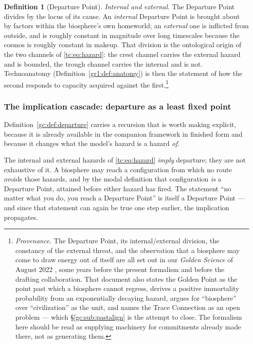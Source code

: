\documentclass[11pt]{article}
\numberwithin{equation}{section}
\theoremstyle{plain}
\theoremstyle{definition}
\newtheorem{definition}[theorem]{Definition}
\theoremstyle{remark}
\begin{document}
\begin{definition}[Departure Point]
\emph{Internal and external.} The Departure Point divides by the
locus of its cause. An \emph{internal} Departure Point is brought about
by factors within the biosphere's own homeworld; an \emph{external} one
is inflicted from outside, and is roughly constant in magnitude over
long timescales because the cosmos is roughly constant in makeup. That
division is the ontological origin of the two channels of
\eqref{tc:eq:hazard}: the crest channel carries the external hazard and
is bounded, the trough channel carries the internal and is not.
Technoanatomy (Definition~\ref{gr1:def:anatomy}) is then the statement
of how the second responds to capacity acquired against the
first.\footnote{\emph{Provenance.} The Departure Point, its
internal/external division, the constancy of the external threat, and
the observation that a biosphere may come to draw energy out of itself
are all set out in our \emph{Golden Science} of August 2022
\cite{GoldenScience22}, some years before the present formalism and
before the drafting collaboration. That document also states the Golden Point as the point
past which a biosphere cannot regress, derives a positive immortality
probability from an exponentially decaying hazard, argues for
``biosphere'' over ``civilization'' as the unit, and names the Trace
Connection as an open problem --- which \S\ref{gc:sub:pastalign} is the
attempt to close. The formalism here should be read as supplying
machinery for commitments already made there, not as generating
them.}
\end{definition}


\subsubsection{The implication cascade: departure as a least fixed point}
\label{gc:subsub:cascade}

Definition~\ref{gc:def:departure} carries a recursion that is worth
making explicit, because it is already available in the companion
framework in finished form and because it changes what the model's
hazard is a hazard \emph{of}.

The internal and external hazards of \eqref{tc:eq:hazard} \emph{imply}
departure; they are not exhaustive of it. A biosphere may reach a
configuration from which no route avoids those hazards, and by the
modal definition that configuration \emph{is} a Departure Point,
attained before either hazard has fired. The statement ``no matter what
you do, you reach a Departure Point'' is itself a Departure Point ---
and since that statement can again be true one step earlier, the
implication propagates.
\end{document}
